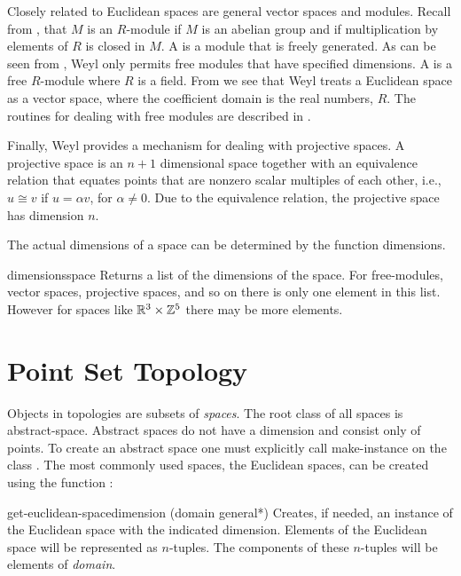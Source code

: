   
Closely related to Euclidean spaces are general vector spaces and
modules. Recall from , that $M$ is an
$R$-module if $M$ is an abelian group and if multiplication by
elements of $R$ is closed in $M$. A  is a module
that is freely generated.  As can be seen from
, Weyl only permits free modules that have
specified dimensions.  A  is a free $R$-module
where $R$ is a field. From  we see that Weyl
treats a Euclidean space as a vector space, where the coefficient
domain is the real numbers, $R$.
The routines for dealing with free modules are described in
.
  
Finally, Weyl provides a mechanism for dealing with projective spaces.
A projective space is an $n+1$ dimensional space together with an
equivalence relation that equates points that are nonzero scalar
multiples of each other, i.e., $u \cong v$ if $u = \alpha v$, for
$\alpha \not= 0$. Due to the equivalence relation, the projective
space has dimension $n$.
  
The actual dimensions of a space can be determined by the function
{\sf dimensions}.
  
\begin{functiondef}{dimensions}{space} 
Returns a list of the dimensions of the space. For
free-modules, vector spaces, projective spaces, and
so on there is only one element in this list. However
for spaces like ${\Bbb R}^3 \times {\Bbb Z}^5$ there may be more elements.
\end{functiondef}
  
\section{Point Set Topology}
\label{PSTopology:Sec}

Objects in topologies are subsets of {\em spaces}.  The root class of
all spaces is abstract-space. Abstract spaces do not have a dimension
and consist only of points.  To create an abstract space one must
explicitly call {\sf make-instance} on the class
. The most commonly used spaces, the Euclidean
spaces, can be created using the function
:
  
\begin{functiondef}{get-euclidean-space}{dimension \optional (domain
{\sf *general*})} Creates, if needed, an instance of the Euclidean
space with the indicated dimension. Elements of the Euclidean space
will be represented as $n$-tuples. The components of these $n$-tuples
will be elements of {\em domain}.
\end{functiondef}  

